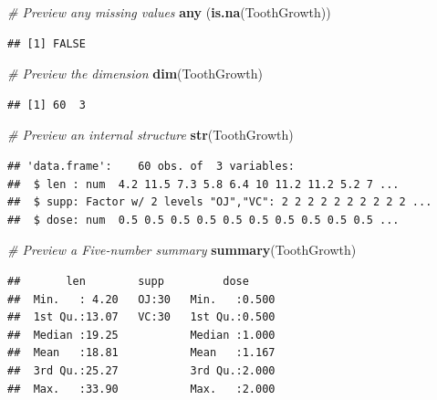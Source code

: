 \documentclass[
  landscape]{article}
\newenvironment{Shaded}{\begin{snugshade}}{\end{snugshade}}
\newcommand{\CommentTok}[1]{\textcolor[rgb]{0.56,0.35,0.01}{\textit{#1}}}
\newcommand{\KeywordTok}[1]{\textcolor[rgb]{0.13,0.29,0.53}{\textbf{#1}}}
\newcommand{\NormalTok}[1]{#1}
\begin{document}
\begin{Shaded}
\begin{Highlighting}[]
\CommentTok{# Preview any missing values}
\KeywordTok{any}\NormalTok{ (}\KeywordTok{is.na}\NormalTok{(ToothGrowth))}
\end{Highlighting}
\end{Shaded}

\begin{verbatim}
## [1] FALSE
\end{verbatim}

\begin{Shaded}
\begin{Highlighting}[]
\CommentTok{# Preview the dimension}
\KeywordTok{dim}\NormalTok{(ToothGrowth)}
\end{Highlighting}
\end{Shaded}

\begin{verbatim}
## [1] 60  3
\end{verbatim}

\begin{Shaded}
\begin{Highlighting}[]
\CommentTok{# Preview an internal structure}
\KeywordTok{str}\NormalTok{(ToothGrowth)}
\end{Highlighting}
\end{Shaded}

\begin{verbatim}
## 'data.frame':    60 obs. of  3 variables:
##  $ len : num  4.2 11.5 7.3 5.8 6.4 10 11.2 11.2 5.2 7 ...
##  $ supp: Factor w/ 2 levels "OJ","VC": 2 2 2 2 2 2 2 2 2 2 ...
##  $ dose: num  0.5 0.5 0.5 0.5 0.5 0.5 0.5 0.5 0.5 0.5 ...
\end{verbatim}

\begin{Shaded}
\begin{Highlighting}[]
\CommentTok{# Preview a Five-number summary}
\KeywordTok{summary}\NormalTok{(ToothGrowth)}
\end{Highlighting}
\end{Shaded}

\begin{verbatim}
##       len        supp         dose      
##  Min.   : 4.20   OJ:30   Min.   :0.500  
##  1st Qu.:13.07   VC:30   1st Qu.:0.500  
##  Median :19.25           Median :1.000  
##  Mean   :18.81           Mean   :1.167  
##  3rd Qu.:25.27           3rd Qu.:2.000  
##  Max.   :33.90           Max.   :2.000
\end{verbatim}
\end{document}
